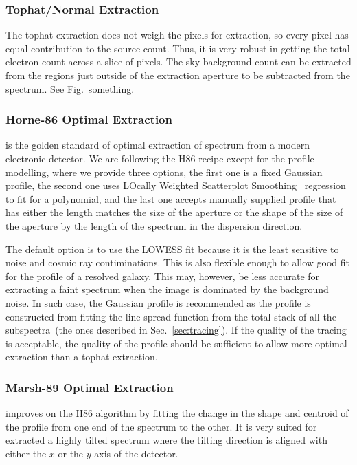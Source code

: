 \documentclass[fleqn,usenatbib]{mnras}
\begin{document}
\subsubsection*{Tophat/Normal Extraction}
The tophat extraction does not weigh the pixels for extraction,
so every pixel has equal contribution to the source count. Thus,
it is very robust in getting the total electron count across
a slice of pixels. The sky background count can be extracted
from the regions just outside of the extraction aperture to be
subtracted from the spectrum. See Fig.~something.

\subsubsection*{Horne-86 Optimal Extraction}
\citet[hereafter H86]{1986PASP...98..609H} is the golden standard
of optimal extraction of spectrum from a modern electronic detector.
We are following the H86 recipe except for the profile modelling,
where we provide three options, the first one is a fixed Gaussian
profile, the second one uses LOcally Weighted Scatterplot
Smoothing~\citep[LOWESS]{doi:10.1080/01621459.1979.10481038}
regression to fit for a polynomial, and the last one accepts
manually supplied profile that has either the length matches the
size of the aperture or the shape of the size of the aperture by
the length of the spectrum in the dispersion direction.

The default option is to use the LOWESS fit because it is the
least sensitive to noise and cosmic ray contiminations. This is
also flexible enough to allow good fit for the profile of a
resolved galaxy. This may, however, be less accurate for
extracting a faint spectrum when the image is dominated by the
background noise. In such case, the Gaussian profile is
recommended as the profile is constructed from fitting the
line-spread-function from the total-stack of all the
subspectra~(the ones described in Sec.~\ref{sec:tracing}). If
the quality of the tracing is acceptable, the quality of the
profile should be sufficient to allow more optimal extraction
than a tophat extraction.

\subsubsection*{Marsh-89 Optimal Extraction}
\citet[hereafter M89]{1989PASP..101.1032M} improves on the H86
algorithm by fitting the change in the shape and centroid of
the profile from one end of the spectrum to the other. It is
very suited for extracted a highly tilted spectrum where the
tilting direction is aligned with either the $x$ or the $y$
axis of the detector.
\end{document}
